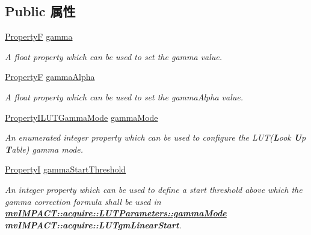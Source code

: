 \subsection*{Public 属性}
\begin{DoxyCompactItemize}
\item 
\hyperlink{group___common_interface_gaf54865fe5a3d5cfd15f9a111b40d09f9}{Property\+F} \hyperlink{classmv_i_m_p_a_c_t_1_1acquire_1_1_l_u_t_parameters_a3be2f11e6b176d9b9494116d992b2e00}{gamma}
\begin{DoxyCompactList}\small\item\em A float property which can be used to set the gamma value. \end{DoxyCompactList}\item 
\hyperlink{group___common_interface_gaf54865fe5a3d5cfd15f9a111b40d09f9}{Property\+F} \hyperlink{classmv_i_m_p_a_c_t_1_1acquire_1_1_l_u_t_parameters_a03304551149637936cf265b33b5dbe2f}{gamma\+Alpha}
\begin{DoxyCompactList}\small\item\em A float property which can be used to set the gamma\+Alpha value. \end{DoxyCompactList}\item 
\hyperlink{group___common_interface_gadd64b7cef36a40fd308cf7efe0209235}{Property\+I\+L\+U\+T\+Gamma\+Mode} \hyperlink{classmv_i_m_p_a_c_t_1_1acquire_1_1_l_u_t_parameters_aa9859adce405ea020bad38f40d779034}{gamma\+Mode}
\begin{DoxyCompactList}\small\item\em An enumerated integer property which can be used to configure the L\+U\+T({\bfseries L}ook {\bfseries U}p {\bfseries T}able) gamma mode. \end{DoxyCompactList}\item 
\hyperlink{group___common_interface_ga12d5e434238ca242a1ba4c6c3ea45780}{Property\+I} \hyperlink{classmv_i_m_p_a_c_t_1_1acquire_1_1_l_u_t_parameters_ac8e85006531eb155a7ccd01590af5e27}{gamma\+Start\+Threshold}
\begin{DoxyCompactList}\small\item\em An integer property which can be used to define a start threshold above which the gamma correction formula shall be used in {\bfseries \hyperlink{classmv_i_m_p_a_c_t_1_1acquire_1_1_l_u_t_parameters_aa9859adce405ea020bad38f40d779034}{mv\+I\+M\+P\+A\+C\+T\+::acquire\+::\+L\+U\+T\+Parameters\+::gamma\+Mode}} {\bfseries mv\+I\+M\+P\+A\+C\+T\+::acquire\+::\+L\+U\+Tgm\+Linear\+Start}. \end{DoxyCompactList}\item 

\end{DoxyCompactItemize}
